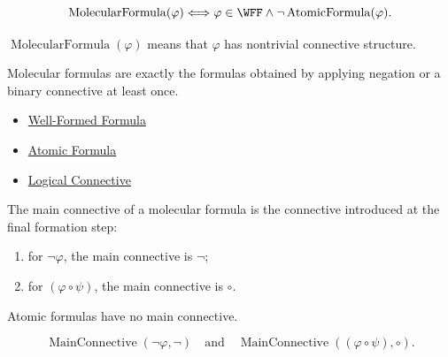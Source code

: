 \begin{remark*}
\[
\operatorname{MolecularFormula}(\varphi)
\Longleftrightarrow
\varphi\in\WFF\land\neg \operatorname{AtomicFormula}(\varphi).
\]
\end{remark*}

\begin{remark*}
\(\operatorname{MolecularFormula}(\varphi)\) means that \(\varphi\) has nontrivial connective structure.
\end{remark*}

\begin{remark*}[Interpretation]
Molecular formulas are exactly the formulas obtained by applying negation or a binary connective at least once.
\end{remark*}

\begin{dependencies}
\begin{itemize}
  \item \hyperref[def:well-formed-formula]{Well-Formed Formula}
  \item \hyperref[def:atomic-formula-propositional-logic]{Atomic Formula}
  \item \hyperref[def:logical-connective]{Logical Connective}
\end{itemize}
\end{dependencies}
\begin{tcolorbox}[colback=propbox, colframe=propborder, arc=2pt,
  left=6pt, right=6pt, top=4pt, bottom=4pt,
  title={\small\textbf{Definition (Main Connective)}},
  fonttitle=\small\bfseries]
\begin{definition}
\label{def:main-connective-propositional-logic}
The main connective of a molecular formula is the connective introduced at the final formation step:
\begin{enumerate}
\item for \(\neg\varphi\), the main connective is \(\neg\);
\item for \((\varphi\circ\psi)\), the main connective is \(\circ\).
\end{enumerate}
Atomic formulas have no main connective.
\end{definition}
\end{tcolorbox}

\begin{remark*}
\[
\operatorname{MainConnective}(\neg\varphi,\neg)
\quad\text{and}\quad
\operatorname{MainConnective}((\varphi\circ\psi),\circ).
\]
\end{remark*}

